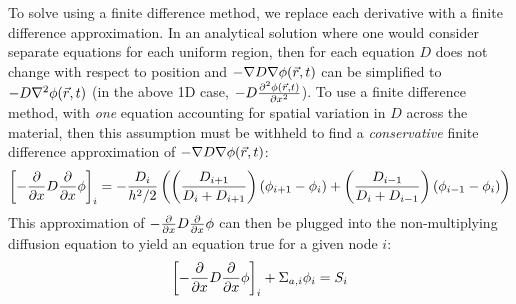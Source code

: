 \documentclass[12pt]{article}
\begin{document}
To solve using a finite difference method, we replace each derivative with a finite difference approximation.
In an analytical solution where one would consider separate equations for each uniform region, then for each equation $D$ does not change with respect to position and $-\nabla D\nabla\phi(\vec{r}, t)$ can be simplified to $-D\nabla^2\phi(\vec{r}, t)$ (in the above 1D case, $-D\frac{\partial^2\phi(\vec{r}, t)}{\partial x^2}$).
To use a finite difference method, with \emph{one} equation accounting for spatial variation in $D$ across the material, then this assumption must be withheld to find a \emph{conservative} finite difference approximation of $-\nabla D\nabla\phi(\vec{r}, t)$:
\newcommand{\pfrac}{\left(\frac{D_{i+1}}{D_i+D_{i+1}}\right)}
\newcommand{\mfrac}{\left(\frac{D_{i-1}}{D_i+D_{i-1}}\right)}
\begin{equation}
    \label{eq:conserv-stream}
    \left[-\ddx D\ddx\phi\right]_i = -\frac{D_i}{h^2/2}\left(\pfrac\left(\phi_{i+1}-\phi_i\right)+\mfrac\left(\phi_{i-1}-\phi_i\right)\right) 
\end{equation}
This approximation of $-\frac{\partial}{\partial x} D\frac{\partial}{\partial x}\phi$ can then be plugged into the non-multiplying diffusion equation to yield an equation true for a given node $i$:
\begin{equation}
    \label{eq:center-findiff-short}
    \left[-\frac{\partial}{\partial x} D\frac{\partial}{\partial x}\phi\right]_i + \Sigma_{a,i}\phi_i = S_i
\end{equation}
\end{document}
